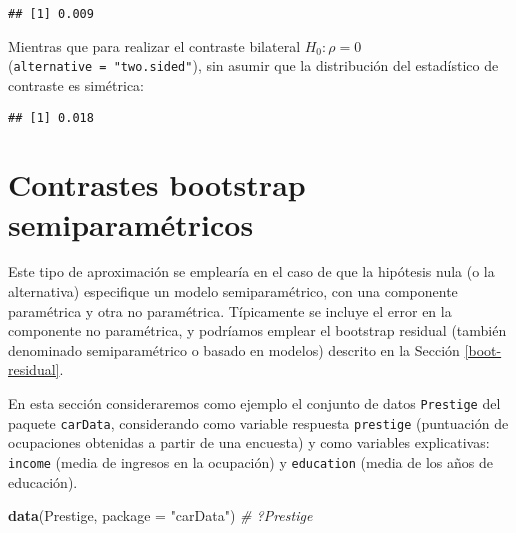 \documentclass[
]{book}
\newenvironment{Shaded}{\begin{snugshade}}{\end{snugshade}}
\newcommand{\CommentTok}[1]{\textcolor[rgb]{0.56,0.35,0.01}{\textit{#1}}}
\newcommand{\DataTypeTok}[1]{\textcolor[rgb]{0.13,0.29,0.53}{#1}}
\newcommand{\DecValTok}[1]{\textcolor[rgb]{0.00,0.00,0.81}{#1}}
\newcommand{\KeywordTok}[1]{\textcolor[rgb]{0.13,0.29,0.53}{\textbf{#1}}}
\newcommand{\NormalTok}[1]{#1}
\newcommand{\OperatorTok}[1]{\textcolor[rgb]{0.81,0.36,0.00}{\textbf{#1}}}
\newcommand{\StringTok}[1]{\textcolor[rgb]{0.31,0.60,0.02}{#1}}
\theoremstyle{break}
\theoremstyle{definition}
\theoremstyle{definition}
\theoremstyle{definition}
\theoremstyle{remark}
\begin{document}
\begin{verbatim}
## [1] 0.009
\end{verbatim}

Mientras que para realizar el contraste bilateral \(H_0: \rho = 0\)
(\texttt{alternative\ =\ "two.sided"}), sin asumir que
la distribución del estadístico de contraste es simétrica:

\begin{Shaded}
\end{Shaded}

\begin{verbatim}
## [1] 0.018
\end{verbatim}

\hypertarget{contrastes-semiparametricos}{%
\section{Contrastes bootstrap semiparamétricos}\label{contrastes-semiparametricos}}

Este tipo de aproximación se emplearía en el caso de que la hipótesis nula
(o la alternativa) especifique un modelo semiparamétrico,
con una componente paramétrica y otra no paramétrica.
Típicamente se incluye el error en la componente no paramétrica, y podríamos emplear
el bootstrap residual (también denominado semiparamétrico o basado en modelos)
descrito en la Sección \ref{boot-residual}.

En esta sección consideraremos como ejemplo el conjunto de datos \texttt{Prestige}
del paquete \texttt{carData}, considerando como variable respuesta \texttt{prestige}
(puntuación de ocupaciones obtenidas a partir de una encuesta)
y como variables explicativas: \texttt{income} (media de ingresos en la ocupación)
y \texttt{education} (media de los años de educación).

\begin{Shaded}
\begin{Highlighting}[]
\KeywordTok{data}\NormalTok{(Prestige, }\DataTypeTok{package =} \StringTok{"carData"}\NormalTok{)}
\CommentTok{# ?Prestige}
\end{Highlighting}
\end{Shaded}
\end{document}
